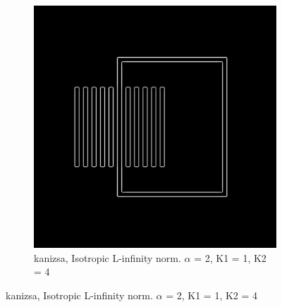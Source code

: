 \begin{figure}[H]
  \centering
  
    \begin{subfigure}{.7\textwidth}
    \centering
    \includegraphics[width=.9\textwidth]{./canny/kanizsa_LINF_a2_k11_k24}
    \caption{kanizsa, Isotropic L-infinity norm. $\alpha$ = 2, K1 = 1, K2 = 4}
    \label{fig:kanizsa_LINF_a2_k11_k24}
  \end{subfigure}%

\end{figure}

